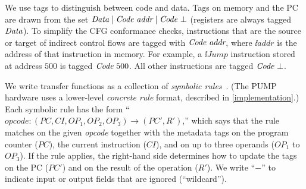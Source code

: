 \newcommand{\RULEWITHPREMISE}[9]{
\typicallabel{}
  \infrule{#7}{\ii{#1} : (#2, #3, #4, #5, #6) \to (#8,#9)}
\typicallabel{MkKey}
}

We use tags to distinguish between code and data.
%
Tags on memory and the PC are drawn from the set
%
$
\textit{Data} \;|\; \textit{Code}~\textit{addr} \;|\; \textit{Code}~\bot
$
(registers are always tagged $\textit{Data}$).
%
To simplify the CFG conformance checks, instructions that are the
source or target of indirect control flows are tagged with
$\textit{Code}~\textit{addr}$, where $\ii{addr}$ is the address of that
instruction in memory.
%
For example, a $\ii{Jump}$ instruction stored at address $500$ is
tagged $\textit{Code}~500$.
%
All other instructions are tagged $\textit{Code}~\bot$.
%

We write transfer functions as a collection of {\em
  symbolic rules}~\cite{popl2015, pump_hasp2014}.
%
(The PUMP hardware uses a lower-level {\em concrete rule} format, 
described in \autoref{implementation}.)
%
Each symbolic rule has the form
%
%
\newcommand{\INLINERULE}[8]{\mathit{#1}
\mathrel{:}\allowbreak
 ({\mathit{#2}},\allowbreak{\mathit{#3}},\allowbreak{\mathit{#4}},\allowbreak{\mathit{#5}},\allowbreak{\mathit{#6}})
 \rightarrow\allowbreak ({\mathit{#7}},\allowbreak{\mathit{#8}})
}%
``$\INLINERULE{opcode}{PC}{CI}{OP_1}{OP_2}{OP_3}{PC'}{R'}$,''
%
which says that the rule matches on the given {\it opcode} together
with the metadata tags on the program counter ($\mathit{PC}$), the
current instruction ($\mathit{CI}$), and on up to three operands
($\mathit{OP_1}$ to $\mathit{OP_3}$).
%
If the rule applies, the right-hand side determines how to update the
tags on the PC ($\mathit{PC'}$) and on the result of the operation
($\mathit{R'}$).
%
We write ``$-$'' to indicate input or output fields that are ignored
(``wildcard'').
%
%
%

